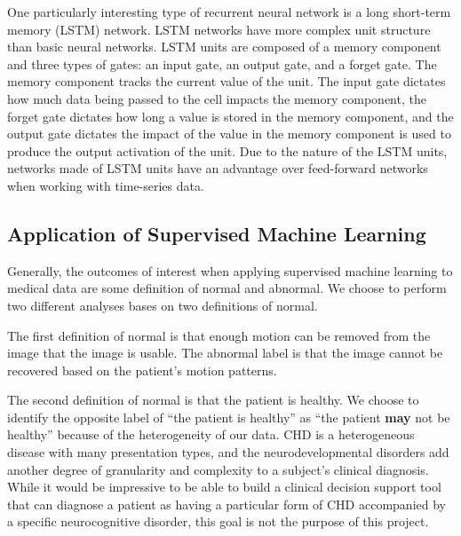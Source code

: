 One particularly interesting type of recurrent neural network is a long short-term memory (LSTM) network. LSTM networks have more complex unit structure than basic neural networks. LSTM units are composed of a memory component and three types of gates: an input gate, an output gate, and a forget gate. The memory component tracks the current value of the unit. The input gate dictates how much data being passed to the cell impacts the memory component, the forget gate dictates how long a value is stored in the memory component, and the output gate dictates the impact of the value in the memory component is used to produce the output activation of the unit. Due to the nature of the LSTM units, networks made of LSTM units have an advantage over feed-forward networks when working with time-series data. 



\subsection{Application of Supervised Machine Learning}

Generally, the outcomes of interest when applying supervised machine learning to medical data are some definition of normal and abnormal. We choose to perform two different analyses bases on two definitions of normal. 

The first definition of normal is that enough motion can be removed from the image that the image is usable. The abnormal label is that the image cannot be recovered based on the patient's motion patterns.

The second definition of normal is that the patient is healthy. We choose to identify the opposite label of ``the patient is healthy'' as ``the patient \textbf{may} not be healthy'' because of the heterogeneity of our data. CHD is a heterogeneous disease with many presentation types, and the neurodevelopmental disorders add another degree of granularity and complexity to a subject's clinical diagnosis. While it would be impressive to be able to build a clinical decision support tool that can diagnose a patient as having a particular form of CHD accompanied by a specific neurocognitive disorder, this goal is not the purpose of this project.

